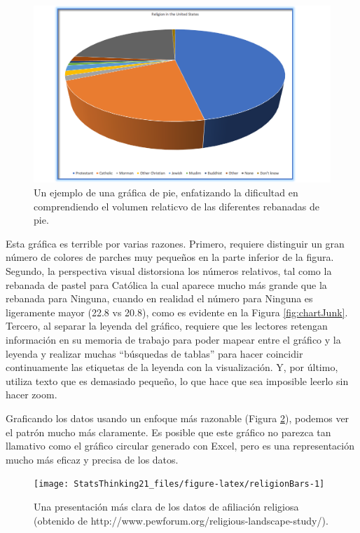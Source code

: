 \documentclass[
  12pt,
]{book}
\theoremstyle{definition}
\theoremstyle{definition}
\theoremstyle{definition}
\theoremstyle{remark}
\begin{document}
\begin{figure}
\includegraphics[width=14.11in,height=0.5\textheight]{images/religion_piechart} \caption{Un ejemplo de una gráfica de pie, enfatizando la dificultad en comprendiendo el volumen relaticvo de las diferentes rebanadas de pie.}\label{fig:pieChart}
\end{figure}

Esta gráfica es terrible por varias razones. Primero, requiere distinguir un gran número de colores de parches muy pequeños en la parte inferior de la figura. Segundo, la perspectiva visual distorsiona los números relativos, tal como la rebanada de pastel para Católica la cual aparece mucho más grande que la rebanada para Ninguna, cuando en realidad el número para Ninguna es ligeramente mayor (22.8 vs 20.8), como es evidente en la Figura \ref{fig:chartJunk}. Tercero, al separar la leyenda del gráfico, requiere que les lectores retengan información en su memoria de trabajo para poder mapear entre el gráfico y la leyenda y realizar muchas ``búsquedas de tablas'' para hacer coincidir continuamente las etiquetas de la leyenda con la visualización. Y, por último, utiliza texto que es demasiado pequeño, lo que hace que sea imposible leerlo sin hacer zoom.

Graficando los datos usando un enfoque más razonable (Figura \ref{fig:religionBars}), podemos ver el patrón mucho más claramente. Es posible que este gráfico no parezca tan llamativo como el gráfico circular generado con Excel, pero es una representación mucho más eficaz y precisa de los datos.

\begin{figure}
\texttt{[image: StatsThinking21\_files/figure-latex/religionBars-1]} \caption{Una presentación más clara de los datos de afiliación religiosa (obtenido de http://www.pewforum.org/religious-landscape-study/).}\label{fig:religionBars}
\end{figure}
\end{document}
